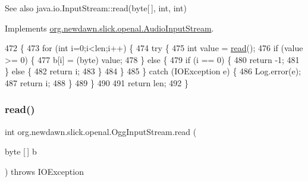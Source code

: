 \begin{DoxySeeAlso}{See also}
java.\+io.\+Input\+Stream\+::read(byte\mbox{[}$\,$\mbox{]}, int, int) 
\end{DoxySeeAlso}


Implements \mbox{\hyperlink{interfaceorg_1_1newdawn_1_1slick_1_1openal_1_1_audio_input_stream_abdaf21295b97e38b8cb70a651c22d553}{org.\+newdawn.\+slick.\+openal.\+Audio\+Input\+Stream}}.


\begin{DoxyCode}
472                                                                    \{
473         \textcolor{keywordflow}{for} (\textcolor{keywordtype}{int} i=0;i<len;i++) \{
474             \textcolor{keywordflow}{try} \{
475                 \textcolor{keywordtype}{int} value = \mbox{\hyperlink{classorg_1_1newdawn_1_1slick_1_1openal_1_1_ogg_input_stream_a66397cab8bce3c41ce7bcb4447a66a46}{read}}();
476                 \textcolor{keywordflow}{if} (value >= 0) \{
477                     b[i] = (byte) value;
478                 \} \textcolor{keywordflow}{else} \{
479                     \textcolor{keywordflow}{if} (i == 0) \{                       
480                         \textcolor{keywordflow}{return} -1;
481                     \} \textcolor{keywordflow}{else} \{
482                         \textcolor{keywordflow}{return} i;
483                     \}
484                 \}
485             \} \textcolor{keywordflow}{catch} (IOException e) \{
486                 Log.error(e);
487                 \textcolor{keywordflow}{return} i;
488             \}
489         \}
490         
491         \textcolor{keywordflow}{return} len;
492     \}
\end{DoxyCode}
\mbox{\label{classorg_1_1newdawn_1_1slick_1_1openal_1_1_ogg_input_stream_a48f59c921cfd04be1f0b1f18f2fcda0a}} 
\subsubsection{\texorpdfstring{read()}{read()}\hspace{0.1cm}{\footnotesize\ttfamily [3/3]}}
{\footnotesize\ttfamily int org.\+newdawn.\+slick.\+openal.\+Ogg\+Input\+Stream.\+read (\begin{DoxyParamCaption}\item[{byte \mbox{[}$\,$\mbox{]}}]{b }\end{DoxyParamCaption}) throws I\+O\+Exception\hspace{0.3cm}{\ttfamily [inline]}}

